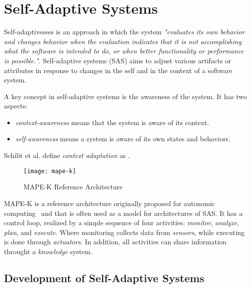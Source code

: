\section{Self-Adaptive Systems}

Self-adaptivesses is an approach in which the system
\emph{"evaluates its own behavior and changes behavior when the evaluation indicates that it is not accomplishing what the software is intended to do, or when better functionality or performance is possible."}\cite{laddaga_self_1997}.
Self-adaptive systems (SAS) aims to adjust various artifacts or attributes in response to changes in the self and in the context of a software system\cite{salehie_self-adaptive_2009}.

A key concept in self-adaptive systems is the awareness of the system. It has two aspects\cite{salehie_self-adaptive_2009}:
\begin{itemize}
   \item \emph{context-awareness} means that the system is aware of its context.
   \item \emph{self-awareness} means a system is aware of its own states and behaviors.
\end{itemize}

Schilit et al.\cite{klein_survey_2008} define \emph{context adaptation} as .

\begin{figure}[!htb]
 \centering
 \texttt{[image: mape-k]}
 \caption{MAPE-K Reference Architecture}
\label{fig:mape-k}
\end{figure}

MAPE-K is a reference architecture originally proposed for autonomic computing~\cite{kephart_vision_2003} and that is often used as a model for architectures of SAS. It has a control loop, realized by a simple sequence of four activities: \emph{monitor}, \emph{analyze}, \emph{plan}, and \emph{execute}. Where monitoring collects data from \emph{sensors}, while executing is done through \emph{actuators}. In addition, all activities can share information throught a \emph{knowledge} system.

\subsection{Development of Self-Adaptive Systems}

